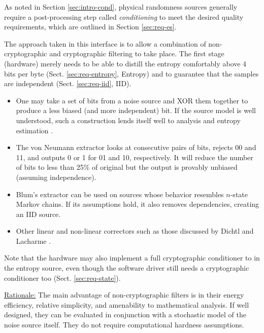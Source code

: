    As noted in Section \ref{sec:intro-cond}, physical randomness sources
    generally require a post-processing step called \emph{conditioning} to
    meet the desired quality requirements, which  are outlined in Section
    \ref{sec:req-es}.

    The approach taken in this interface is to allow a combination of
    non-cryptographic and cryptographic filtering to take place. The
    first stage (hardware) merely needs to be able to distill the entropy
    comfortably above 4 bits per byte (Sect. \ref{sec:req-entropy},
    Entropy) and to guarantee that the samples are independent
    (Sect. \ref{sec:req-iid}, IID).

    \begin{itemize}
    \item   One may take a set of bits from a noise source and XOR them
            together to produce a less biased (and more independent) bit.
            If the source model is well understood, such a construction
            lends itself well to analysis and entropy estimation \cite{Da02}.
    \item   The von Neumann extractor \cite{Ne51} looks at consecutive
            pairs of bits, rejects 00 and 11, and outputs 0 or 1 for
            01 and 10, respectively. It will reduce the number of bits to
            less than 25\% of original but the output is provably unbiased
            (assuming independence).
    \item   Blum's extractor \cite{Bl86} can be used on sources
            whose behavior resembles $n$-state Markov chains. If its
            assumptions hold, it also removes dependencies, creating an IID
            source.
    \item   Other linear and non-linear correctors such as those
            discussed by Dichtl and Lacharme \cite{La08}.
    \end{itemize}

    Note that the hardware may
    also implement a full cryptographic conditioner to in the entropy
    source, even though the software driver still needs
    a cryptographic conditioner too (Sect. \ref{sec:req-state}).

    \underline{Rationale:}
    The main advantage of non-cryptographic filters is in their
    energy efficiency, relative simplicity, and amenability to mathematical
    analysis. If well designed, they can be evaluated in
    conjunction with a stochastic model of the noise source itself.
    They do not require computational hardness assumptions.

